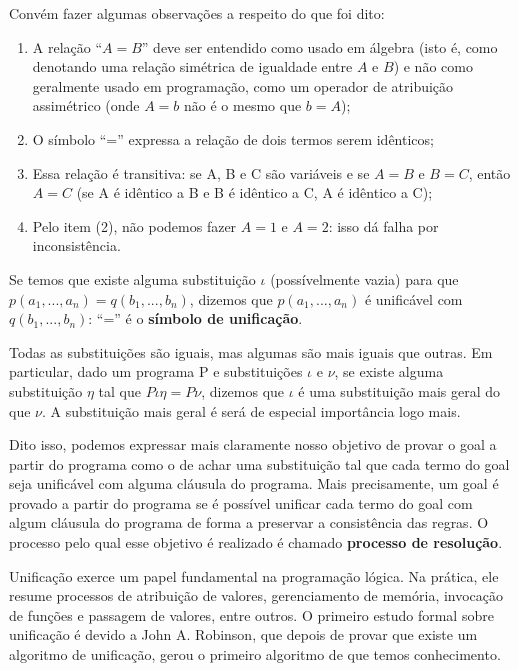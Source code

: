 \documentclass{article}
\theoremstyle{remark}
\theoremstyle{theorem}
\begin{document}
Convém fazer algumas observações a respeito do que foi dito:

\begin{enumerate}
  \item A relação ``$A = B$'' deve ser entendido como usado em álgebra (isto é, como denotando uma relação simétrica de igualdade entre $A$ e $B$) e não como geralmente usado em programação, como um operador de atribuição assimétrico (onde $A = b$ não é o mesmo que $b = A$);
  \item O símbolo ``='' expressa a relação de dois termos serem idênticos;
  \item Essa relação é transitiva: se A, B e C são variáveis e se $A = B$ e $B = C$, então $A = C$ (se A é idêntico a B e B é idêntico a C, A é idêntico a C);
  \item Pelo item (2), não podemos fazer $A = 1$ e $A = 2$: isso dá falha por inconsistência.
\end{enumerate}

Se temos que existe alguma substituição $\iota$ (possívelmente vazia) para que $p(a_1, ..., a_n) = q(b_1, ..., b_n)$, dizemos que  $p(a_1, ..., a_n)$ é unificável com $q(b_1, ..., b_n)$: ``='' é o \textbf{símbolo de unificação}.

Todas as substituições são iguais, mas algumas são mais iguais que outras. Em particular, dado um programa P e substituições $\iota$ e $\nu$, se existe alguma substituição $\eta$ tal que $P\iota\eta = P \nu$, dizemos que $\iota$ é uma substituição mais geral do que $\nu$. A substituição mais geral é será de especial importância logo mais.

Dito isso, podemos expressar mais claramente nosso objetivo de provar o goal a partir do programa como o de achar uma substituição tal que cada termo do goal seja unificável com alguma cláusula do programa. Mais precisamente, um goal é provado a partir do programa se é possível unificar cada termo do goal com algum cláusula do programa de forma a preservar a consistência das regras. O processo pelo qual esse objetivo é realizado é chamado \textbf{processo de resolução}.

Unificação exerce um papel fundamental na programação lógica. Na prática, ele resume processos de atribuição de valores, gerenciamento de memória, invocação de funções e passagem de valores, entre outros. O primeiro estudo formal sobre unificação é devido a John A. Robinson, que depois de provar que existe um algoritmo de unificação, gerou o primeiro algoritmo de que temos conhecimento.
\end{document}
